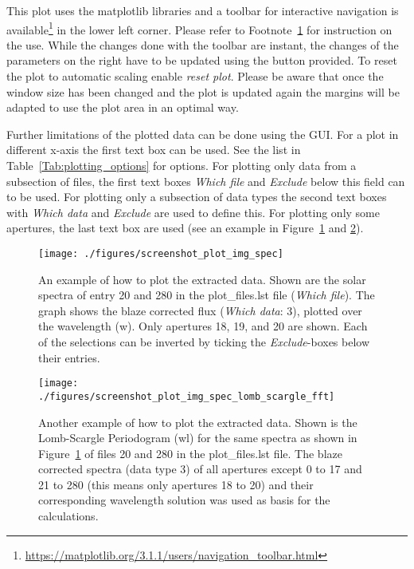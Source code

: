 \documentclass[10pt,a4paper]{article}
\begin{document}
This plot uses the matplotlib libraries and a toolbar for interactive navigation is available\footnote{\label{Footnote:matplotlib_toolbar} \url{https://matplotlib.org/3.1.1/users/navigation_toolbar.html}} in the lower left corner. Please refer to Footnote~\ref{Footnote:matplotlib_toolbar} for instruction on the use. While the changes done with the toolbar are instant, the changes of the parameters on the right have to be updated using the button provided. To reset the plot to automatic scaling enable \textit{reset plot}. Please be aware that once the window size has been changed and the plot is updated again the margins will be adapted to use the plot area in an optimal way.

Further limitations of the plotted data can be done using the GUI. For a plot in different x-axis the first text box can be used. See the list in Table~\ref{Tab:plotting_options} for options. For plotting only data from a subsection of files, the first text boxes \textit{Which file} and \textit{Exclude} below this field can to be used. For plotting only a subsection of data types the second text boxes with \textit{Which data} and \textit{Exclude} are used to define this. For plotting only some apertures, the last text box are used (see an example in Figure~\ref{figure_plotting_results_example1} and \ref{figure_plotting_results_example2}).

\begin{figure} 
  \begin{center}
    \texttt{[image: ./figures/screenshot\_plot\_img\_spec]}
  \end{center} 
  \caption{An example of how to plot the extracted data. Shown are the solar spectra of entry 20 and 280 in the plot\_files.lst file (\textit{Which file}). The graph shows the blaze corrected flux (\textit{Which data}: 3), plotted over the wavelength (w). Only apertures 18, 19, and 20 are shown. Each of the selections can be inverted by ticking the \textit{Exclude}-boxes below their entries.
    \label{figure_plotting_results_example1}}
\end{figure}

\begin{figure} 
  \begin{center}
    \texttt{[image: ./figures/screenshot\_plot\_img\_spec\_lomb\_scargle\_fft]}
  \end{center} 
  \caption{Another example of how to plot the extracted data. Shown is the Lomb-Scargle Periodogram (wl) for the same spectra as shown in Figure~\ref{figure_plotting_results_example1} of files 20 and 280 in the plot\_files.lst file. The blaze corrected spectra (data type 3) of all apertures except 0 to 17 and 21 to 280 (this means only apertures 18 to 20) and their corresponding wavelength solution was used as basis for the calculations.
    \label{figure_plotting_results_example2}}
\end{figure}
\end{document}
